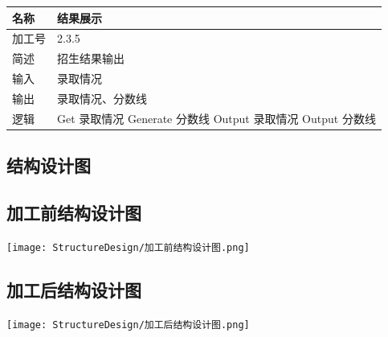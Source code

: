 \documentclass[CJK,utf8]{ctexrep}
\begin{document}
\begin{tabularx}{0.85\textwidth}{|l|X|}
	\hline
	\textbf{名称} & \textbf{结果展示} \\
	\hline
	加工号 & 2.3.5 \\
	\hline
	简述 & 招生结果输出 \\
	\hline
	输入 & 录取情况 \\
	\hline
	输出 & 录取情况、分数线 \\
	\hline
	\multirow{4}{*}{逻辑} & \ttfamily
	Get 录取情况 \newline
	Generate 分数线 \newline
	Output 录取情况 \newline
	Output 分数线\\
	\hline
\end{tabularx}

\begin{landscape}
	\section*{结构设计图}
	
	\subsection*{加工前结构设计图}
	
	\texttt{[image: StructureDesign/加工前结构设计图.png]}
	
	\subsection*{加工后结构设计图}
	
	\texttt{[image: StructureDesign/加工后结构设计图.png]}
\end{landscape}
\end{document}
